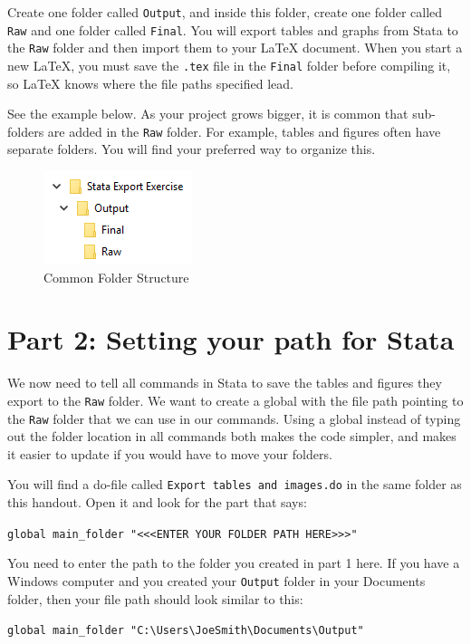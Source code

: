 \documentclass[]{article}
\begin{document}
Create one folder called \texttt{Output}, and inside this folder, create one folder called \texttt{Raw} and one folder called \texttt{Final}. You will export tables and graphs from Stata to the \texttt{Raw} folder and then import them to your {\LaTeX} document. When you start a new {\LaTeX}, you must save the \texttt{.tex} file in the \texttt{Final} folder before compiling it, so {\LaTeX} knows where the file paths specified lead.

See the example below. As your project grows bigger, it is common that sub-folders are added in the \texttt{Raw} folder. For example, tables and figures often have separate folders. You will find your preferred way to organize this.

\begin{figure}[H]
	\centering
	\includegraphics[width=0.3\linewidth]{img/outputRawFolders}
	\caption{Common Folder Structure}
	\label{fig:pathwin3}
\end{figure} 


\section*{Part 2: Setting your path for Stata}
We now need to tell all commands in Stata to save the tables and figures they export to the \texttt{Raw} folder. We want to create a global with the file path pointing to the \texttt{Raw} folder that we can use in our commands. Using a global instead of typing out the folder location in all commands both makes the code simpler, and makes it easier to update if you would have to move your folders.

You will find a do-file called \texttt{Export tables and images.do} in the same folder as this handout. Open it and look for the part that says:
\begin{center}
	\verb|global main_folder "<<<ENTER YOUR FOLDER PATH HERE>>>"|
\end{center}

You need to enter the path to the folder you created in part 1 here. If you have a Windows computer and you created your \texttt{Output} folder in your Documents folder, then your file path should look similar to this:
\begin{center}
	\verb|global main_folder "C:\Users\JoeSmith\Documents\Output"|
\end{center}
\end{document}
